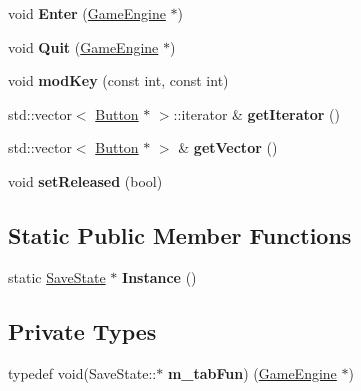 \begin{DoxyCompactItemize}
\item 
\hypertarget{class_save_state_a63dbb5127a8fe82c4b64a8781bbf0c8a}{}void {\bfseries Enter} (\hyperlink{class_game_engine}{Game\+Engine} $\ast$)\label{class_save_state_a63dbb5127a8fe82c4b64a8781bbf0c8a}

\item 
\hypertarget{class_save_state_af0c484f58c46462d80e0d91c1fcaef34}{}void {\bfseries Quit} (\hyperlink{class_game_engine}{Game\+Engine} $\ast$)\label{class_save_state_af0c484f58c46462d80e0d91c1fcaef34}

\item 
\hypertarget{class_save_state_ada992f61dc5f2623266469497b7b81fd}{}void {\bfseries mod\+Key} (const int, const int)\label{class_save_state_ada992f61dc5f2623266469497b7b81fd}

\item 
\hypertarget{class_save_state_a87cc888ef95efcb2e67d88f158b61a4f}{}std\+::vector$<$ \hyperlink{class_button}{Button} $\ast$ $>$\+::iterator \& {\bfseries get\+Iterator} ()\label{class_save_state_a87cc888ef95efcb2e67d88f158b61a4f}

\item 
\hypertarget{class_save_state_a6389b126a10fd88e42d73f8b059a9b49}{}std\+::vector$<$ \hyperlink{class_button}{Button} $\ast$ $>$ \& {\bfseries get\+Vector} ()\label{class_save_state_a6389b126a10fd88e42d73f8b059a9b49}

\item 
\hypertarget{class_save_state_aa7fb30cd8f789bd0b5cef89a02440912}{}void {\bfseries set\+Released} (bool)\label{class_save_state_aa7fb30cd8f789bd0b5cef89a02440912}

\end{DoxyCompactItemize}
\subsection*{Static Public Member Functions}
\begin{DoxyCompactItemize}
\item 
\hypertarget{class_save_state_a4a07fd28e32eab3030d0163c405317a1}{}static \hyperlink{class_save_state}{Save\+State} $\ast$ {\bfseries Instance} ()\label{class_save_state_a4a07fd28e32eab3030d0163c405317a1}

\end{DoxyCompactItemize}
\subsection*{Private Types}
\begin{DoxyCompactItemize}
\item 
\hypertarget{class_save_state_a7a6ea7fdde07f93dc9de0bbf2dc2f51b}{}typedef void(Save\+State\+::$\ast$ {\bfseries m\+\_\+tab\+Fun}) (\hyperlink{class_game_engine}{Game\+Engine} $\ast$)\label{class_save_state_a7a6ea7fdde07f93dc9de0bbf2dc2f51b}

\end{DoxyCompactItemize}
